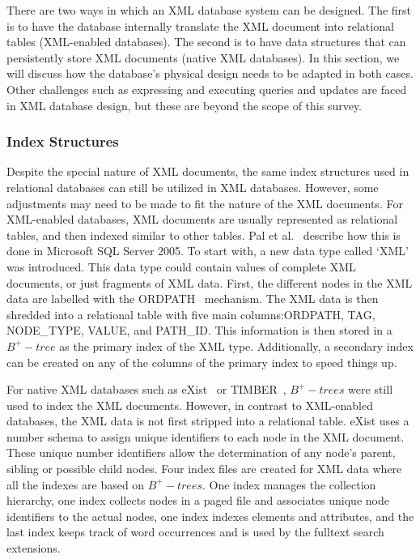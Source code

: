 \documentclass[12pt,a4paper]{article}
\begin{document}
There are two ways in which an XML database system can be designed. The first is to have the database internally translate the XML document into relational
tables (XML-enabled databases). The second is to have data structures that can persistently store XML documents (native XML databases). In this section, we will
discuss how the database's physical design needs to be adapted in both cases. Other challenges such as expressing and executing queries and updates are faced in
XML database design, but these are beyond the scope of this survey.



\subsubsection{Index Structures}

Despite the special nature of XML documents, the same index structures used in relational databases can still be utilized in XML databases. However, some
adjustments may need to be made to fit the nature of the XML documents. For XML-enabled databases, XML documents are usually represented as relational tables,
and then indexed similar to other tables. Pal et al.~\cite{pal2004indexing} describe how this is done in Microsoft SQL Server 2005. To start with, a new data
type called `XML' was introduced. This data type could contain values of complete XML documents, or just fragments of XML data. First, the different nodes in
the XML data are labelled with the ORDPATH~\cite{o2004ordpaths} mechanism. The XML data is then shredded into a relational table with five main columns:ORDPATH,
TAG, NODE\_TYPE, VALUE, and PATH\_ID. This information is then stored in a $B^{+}-tree$ as the primary index of the XML type. Additionally, a secondary index
can be created on any of the columns of the primary index to speed things up.


For native XML databases such as eXist~\cite{meier2009exist} or TIMBER~\cite{jagadish2002timber}, $B^{+}-trees$ were still used to index the XML documents.
However, in contrast to XML-enabled databases, the XML data is not first stripped into a relational table. eXist uses a number schema to assign unique
identifiers to each node in the XML document. These unique number identifiers allow the determination of any node's parent, sibling or possible child nodes.
Four index files are created for XML data where all the indexes are based on $B^{+}-trees$. One index manages the collection hierarchy, one index collects nodes
in a paged file and associates unique node identifiers to the actual nodes, one index indexes elements and attributes, and the last index keeps track of word
occurrences and is used by the fulltext search extensions.
\end{document}
